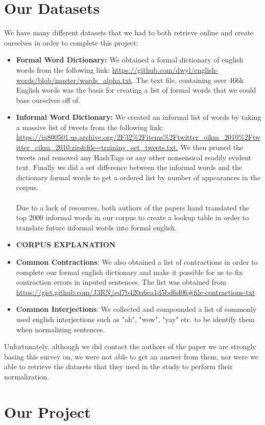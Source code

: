 \documentclass{article}
\begin{document}
\section{Our Datasets}
We have many different datasets that we had to both retrieve online and create ourselves in order to complete this project:
\begin{itemize}
	\item \textbf{Formal Word Dictionary:} We obtained a formal dictionary of english words from the following link: \url{https://github.com/dwyl/english-words/blob/master/words_alpha.txt}. The text file, containing over 466k English words was the basis for creating a list of formal words that we could base ourselves off of.
	\item \textbf{Informal Word Dictionary:} We created an informal list of words by taking a massive list of tweets from the following link: \url{https://ia800501.us.archive.org/2F32%2Fitems%2Ftwitter_cikm_2010%2Ftwitter_cikm_2010.zip&file=training_set_tweets.txt.}  We then  pruned the tweets and removed any HashTags or any other nonsensical readily evident text. Finally we did a set difference between the informal words and the dictionary formal words to get a ordered list by number of appearances in the corpus. \\\\
	Due to a lack of resources, both authors of the papers hand translated the top 2000 informal words in our corpus to create a lookup table in order to translate future informal words into formal english.
	\item \textbf{CORPUS EXPLANATION}
	\item \textbf{Common Contractions}: We also obtained a list of contractions in order to complete our formal english dictionary and make it possible for us to fix contraction errors in inputed sentences. The list was obtained from \url{https://gist.github.com/J3RN/ed7b420a6ea1d5bd6d06#file-contractions-txt}
	\item \textbf{Common Interjections}: We collected and compounded a list of commonly used english interjections such as "ah", "wow", "yay" etc. to be identify them when normalizing sentences.
\end{itemize}
Unfortunately, although we did contact the authors of the paper we are strongly basing this survey on, we were not able to get an answer from them, nor were we able to retrieve the datasets that they used in the study to perform their normalization.

\section{Our Project}
\end{document}
